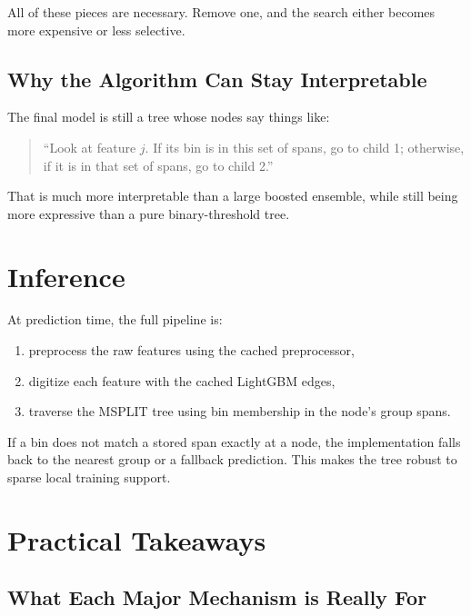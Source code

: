 \documentclass[11pt]{article}
\begin{document}
All of these pieces are necessary. Remove one, and the search either becomes more expensive or less selective.

\subsection{Why the Algorithm Can Stay Interpretable}

The final model is still a tree whose nodes say things like:

\begin{quote}
``Look at feature \(j\). If its bin is in this set of spans, go to child 1; otherwise, if it is in that set of spans, go to child 2.''
\end{quote}

That is much more interpretable than a large boosted ensemble, while still being more expressive than a pure binary-threshold tree.

\section{Inference}

At prediction time, the full pipeline is:

\begin{enumerate}
\item preprocess the raw features using the cached preprocessor,
\item digitize each feature with the cached LightGBM edges,
\item traverse the MSPLIT tree using bin membership in the node's group spans.
\end{enumerate}

If a bin does not match a stored span exactly at a node, the implementation falls back to the nearest group or a fallback prediction. This makes the tree robust to sparse local training support.

\section{Practical Takeaways}

\subsection{What Each Major Mechanism is Really For}
\end{document}
